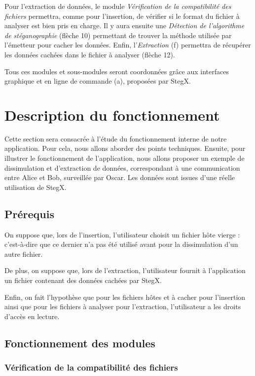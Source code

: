 \documentclass[11pt]{article}
\begin{document}
Pour l'extraction de données, le module \textit{Vérification de la compatibilité 
des fichiers} permettra, comme pour l'insertion, de vérifier si le format 
du fichier à analyser est bien pris en charge. 
Il y aura ensuite une \textit{Détection de l'algorithme de stéganographie} 
(flèche 10) permettant de trouver la méthode utilisée par l'émetteur pour 
cacher les données. 
Enfin, l'\textit{Extraction} (f) permettra de récupérer les données cachées 
dans le fichier à analyser (flèche 12). 

Tous ces modules et sous-modules seront coordonnées grâce aux interfaces 
graphique et en ligne de commande (a), proposées par StegX. 


\section{Description du fonctionnement}

Cette section sera consacrée à l'étude du fonctionnement interne de notre
application. Pour cela, nous allons aborder des points techniques. Ensuite, pour
illustrer le fonctionnement de l'application, nous allons proposer un exemple de
dissimulation et d'extraction de données, correspondant à une communication
entre Alice et Bob, surveillée par Oscar. Les données sont issues d'une réelle
utilisation de StegX. 

\subsection{Prérequis}

On suppose que, lors de l'insertion, l'utilisateur choisit un fichier hôte
vierge : c'est-à-dire que ce dernier n'a pas été utilisé avant pour la 
dissimulation d'un autre fichier. 

De plus, on suppose que, lors de l'extraction, l'utilisateur fournit à 
l'application un fichier contenant des données cachées par StegX. 

Enfin, on fait l'hypothèse que pour les fichiers hôtes et à cacher pour l'insertion 
ainsi que pour les fichiers à analyser pour l'extraction, l'utilisateur a 
les droits d'accès en lecture. 

\subsection{Fonctionnement des modules}

\subsubsection{Vérification de la compatibilité des fichiers}
\end{document}
